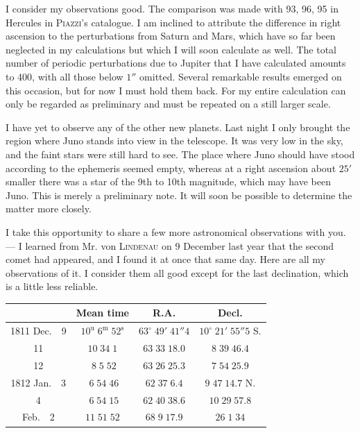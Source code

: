 \par\indent I consider my observations good. The comparison was made with 93, 96, 95 in Hercules in \textsc{Piazzi}’s catalogue. I am inclined to attribute the difference in right ascension to the perturbations from Saturn and Mars, which have so far been neglected in my calculations but which I will soon calculate as well. The total number of periodic perturbations due to Jupiter that I have calculated amounts to 400, with all those below $1''$ omitted. Several remarkable results emerged on this occasion, but for now I must hold them back. For my entire calculation can only be regarded as preliminary and must be repeated on a still larger scale.

\par\indent I have yet to observe any of the other new planets. Last night I only brought the region where Juno stands into view in the telescope. It was very low in the sky, and the faint stars were still hard to see. The place where Juno should have stood according to the ephemeris seemed empty, whereas at a right ascension about $25'$ smaller there was a star of the 9th to 10th magnitude, which may have been Juno. This is merely a preliminary note. It will soon be possible to determine the matter more closely.

\par\indent I take this opportunity to share a few more astronomical observations with you. — I learned from Mr. von \textsc{Lindenau} on 9 December last year that the second comet had appeared, and I found it at once that same day. Here are all my observations of it. I consider them all good except for the last declination, which is a little less reliable.

\begin{center}
\fontsize{10}{12}\selectfont\setlength{\tabcolsep}{3pt}\renewcommand{\arraystretch}{1.15}\begin{tabular}{c|c|c|c}
 & Mean time & R.A. & Decl. \\
\hline
1811 Dec.\ \ 9 & $10^{\mathrm u}\;6^{\mathrm m}\;52^{\mathrm s}$ & $63^\circ\;49'\;41''4$ & $10^\circ\;21'\;55''5$ S. \\
11 & $10\;34\;1$ & $63\;33\;18.0$ & $8\;39\;46.4$ \\
12 & $\;8\;5\;52$ & $63\;26\;25.3$ & $7\;54\;25.9$ \\
1812 Jan.\ \ 3 & $\;6\;54\;46$ & $62\;37\;6.4$ & $9\;47\;14.7$ N. \\
4 & $\;6\;54\;15$ & $62\;40\;38.6$ & $10\;29\;57.8$ \\
Feb.\ \ 2 & $11\;51\;52$ & $68\;9\;17.9$ & $26\;1\;34$ \\
\end{tabular}
\end{center}

